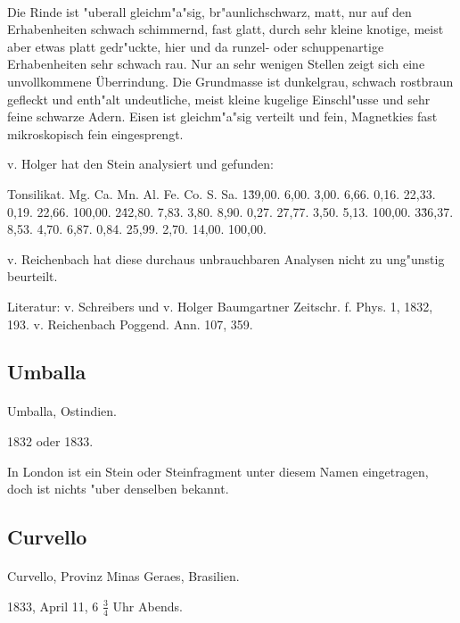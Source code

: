 \documentclass[a4paper, 11pt, oneside]{article}
\begin{document}
\paragraph{}
Die Rinde ist "uberall gleichm"a"sig, br"aunlichschwarz, matt, nur auf den Erhabenheiten schwach schimmernd, fast glatt, durch sehr kleine knotige, meist aber etwas platt gedr"uckte, hier und da runzel- oder schuppenartige Erhabenheiten sehr schwach rau. Nur an sehr wenigen Stellen zeigt sich eine unvollkommene Überrindung. Die Grundmasse ist dunkelgrau, schwach rostbraun gefleckt und enth"alt undeutliche, meist kleine kugelige Einschl"usse und sehr feine schwarze Adern. Eisen ist gleichm"a"sig verteilt und fein, Magnetkies fast mikroskopisch fein eingesprengt.

v. Holger hat den Stein analysiert und gefunden:

Tonsilikat. Mg. Ca. Mn. Al. Fe. Co. S. Sa.  
1\. 39,00. 6,00. 3,00. 6,66. 0,16. 22,33. 0,19. 22,66. 100,00.  
2\. 42,80. 7,83. 3,80. 8,90. 0,27. 27,77. 3,50. 5,13. 100,00.  
3\. 36,37. 8,53. 4,70. 6,87. 0,84. 25,99. 2,70. 14,00. 100,00.

v. Reichenbach hat diese durchaus unbrauchbaren Analysen nicht zu ung"unstig beurteilt.

\footnotesize
Literatur: v. Schreibers und v. Holger Baumgartner Zeitschr. f. Phys. 1, 1832, 193. v. Reichenbach Poggend. Ann. 107, 359.

\subsection{Umballa}
\normalsize
\paragraph{}
Umballa, Ostindien.

1832 oder 1833.

In London ist ein Stein oder Steinfragment unter diesem Namen eingetragen, doch ist nichts "uber denselben bekannt.

\subsection{Curvello}
\normalsize
\paragraph{}
Curvello, Provinz Minas Geraes, Brasilien.

1833, April 11, 6 $\frac{3}{4}$ Uhr Abends.
\end{document}
